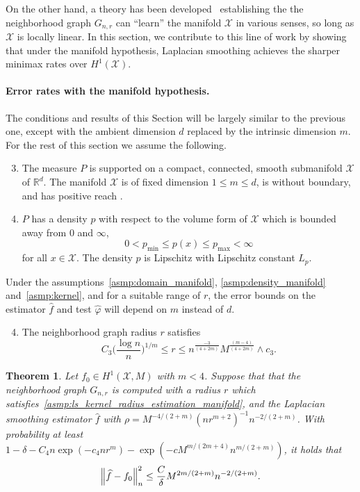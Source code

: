 \documentclass[twoside]{article}
\newcommand{\Reals}{\mathbb{R}}
\newcommand{\1}{\mathbf{1}}
\newcommand{\Xset}{\mathcal{X}}
\newcommand{\wh}[1]{\widehat{#1}}
\newtheorem{theorem}{Theorem}
\theoremstyle{definition}
\theoremstyle{remark}
\begin{document}
On the other hand, a theory has been developed~\citep{belkin03,belkin05,niyogi2013} establishing the the neighborhood graph $G_{n,r}$ can ``learn'' the manifold $\Xset$ in various senses, so long as $\Xset$ is locally linear. In this section, we contribute to this line of work by showing that under the manifold hypothesis, Laplacian smoothing achieves the sharper minimax rates over $H^1(\Xset)$.

\paragraph{Error rates with the manifold hypothesis.}
The conditions and results of this Section will be largely similar to the previous one, except with the ambient dimension $d$ replaced by the intrinsic dimension $m$. For the rest of this section we assume the following.
\begin{enumerate}[label=(P\arabic*)]
	\setcounter{enumi}{2}
	\item 
	\label{asmp:domain_manifold}
	The measure $P$ is supported on a compact, connected, smooth submanifold $\Xset$ of $\Reals^d$. The manifold $\Xset$ is of fixed dimension $1 \leq m \leq d$, is without boundary, and has positive reach \citep{federer1959}.
	\item 
	\label{asmp:density_manifold} $P$ has a density $p$ with respect to the volume form of $\Xset$ which is bounded away from $0$ and $\infty$,
	\begin{equation*}
	0 < p_{\min} \leq p(x) \leq p_{\max} < \infty
	\end{equation*}
	for all $x \in \Xset$. The density $p$ is Lipschitz with Lipschitz constant $L_p$.
\end{enumerate}
Under the assumptions~\ref{asmp:domain_manifold}, \ref{asmp:density_manifold} and~\ref{asmp:kernel}, and for a suitable range of $r$, the error bounds on the estimator $\wh{f}$ and test $\wh{\varphi}$ will depend on $m$ instead of $d$. 

\begin{enumerate}[label=(R\arabic*)]
	\setcounter{enumi}{3}
	\item 
	\label{asmp:ls_kernel_radius_estimation_manifold}
	The neighborhood graph radius $r$ satisfies
	\begin{equation*}
	C_3\biggl(\frac{\log n}{n}\biggr)^{1/m} \leq r \leq n^{\frac{-3}{(4 + 2m)}} M^{\frac{(m - 4)}{(4 + 2m)}} \wedge c_3.
	\end{equation*}
\end{enumerate}
\begin{theorem}
	\label{thm:laplacian_smoothing_estimation_manifold}
	Let $f_0 \in H^1(\Xset,M)$ with $m < 4$. Suppose that that the neighborhood graph $G_{n,r}$ is computed with a radius $r$ which satisfies~\ref{asmp:ls_kernel_radius_estimation_manifold},  and the Laplacian smoothing estimator $\wh{f}$ with $\rho = M^{-4/(2 + m)} (nr^{m + 2})^{-1} n^{-2/(2 + m)}$. With probability at least $1 - \delta -  C_4n\exp(-c_4nr^m) - \exp(-c M^{m/(2m + 4)} n^{m/(2+m)})$, it holds that
	\begin{equation*}
	\Bigl\|\wh{f} - f_0\Bigr\|_n^2 \leq \frac{C}{\delta} M^{2m/(2 + m)} n^{-2/(2 + m)}.
	\end{equation*}
\end{theorem}
\end{document}
